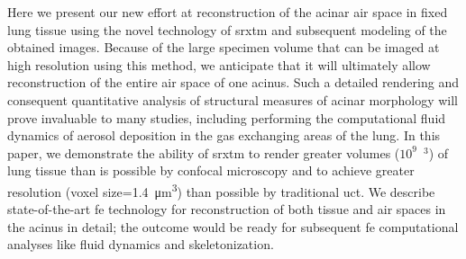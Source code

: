 Here we present our new effort at \threed reconstruction of the acinar air space in fixed lung tissue using the novel technology of \ac{srxtm} and subsequent \threed modeling of the obtained images. Because of the large specimen volume that can be imaged at high resolution using this method, we anticipate that it will ultimately allow \threed reconstruction of the entire air space of one acinus. Such a detailed rendering and consequent \threed quantitative analysis of structural measures of acinar morphology will prove invaluable to many studies, including performing the computational fluid dynamics of aerosol deposition in the gas exchanging areas of the lung. In this paper, we demonstrate the ability of \ac{srxtm} to render greater volumes ($10^9$~\micro\meter$^3$) of lung tissue than is possible by confocal microscopy and to achieve greater resolution (voxel size=\SI{1.4}{\micro\meter\cubed}) than possible by traditional \ac{uct}. We describe state-of-the-art \acl{fe} technology for \threed reconstruction of both tissue and air spaces in the acinus in detail; the outcome would be ready for subsequent \ac{fe} computational analyses like fluid dynamics and skeletonization.


